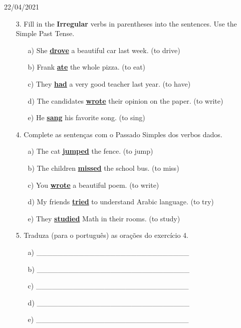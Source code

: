 \documentclass{SchoolBook}
\begin{document}
\begin{day}{22/04/2021}
\begin{enumerate}
            \item[3.] Fill in the \textbf{Irregular} verbs in parentheses into the sentences. Use the Simple Past Tense.
            \begin{enumerate}
                \item[a)] She \underline{\bf drove} a beautiful car last week. (to drive)
                \item[b)] Frank \underline{\bf ate} the whole pizza. (to eat)
                \item[c)] They \underline{\bf had} a very good teacher last year. (to have)
                \item[d)] The candidates \underline{\bf wrote} their opinion on the paper. (to write)
                \item[e)] He \underline{\bf sang} his favorite song. (to sing)
            \end{enumerate}

            \item[4.] Complete as sentenças com o Passado Simples dos verbos dados.
            \begin{enumerate}
                \item[a)] The cat \underline{\bf jumped} the fence. (to jump)
                \item[b)] The children \underline{\bf missed} the school bus. (to miss)
                \item[c)] You \underline{\bf wrote} a beautiful poem. (to write)
                \item[d)] My friends \underline{\bf tried} to understand Arabic language. (to try)
                \item[e)] They \underline{\bf studied} Math in their rooms. (to study)
            \end{enumerate}

            \pagebreak

            \item[5.] Traduza (para o português) as orações do exercício 4.
            \begin{enumerate}
                \item[a)] \_\_\_\_\_\_\_\_\_\_\_\_\_\_\_\_\_\_\_\_\_\_\_\_\_\_\_\_\_
                \item[b)] \_\_\_\_\_\_\_\_\_\_\_\_\_\_\_\_\_\_\_\_\_\_\_\_\_\_\_\_\_
                \item[c)] \_\_\_\_\_\_\_\_\_\_\_\_\_\_\_\_\_\_\_\_\_\_\_\_\_\_\_\_\_
                \item[d)] \_\_\_\_\_\_\_\_\_\_\_\_\_\_\_\_\_\_\_\_\_\_\_\_\_\_\_\_\_
                \item[e)] \_\_\_\_\_\_\_\_\_\_\_\_\_\_\_\_\_\_\_\_\_\_\_\_\_\_\_\_\_
            \end{enumerate}


\end{enumerate}
\end{day}
\end{document}
